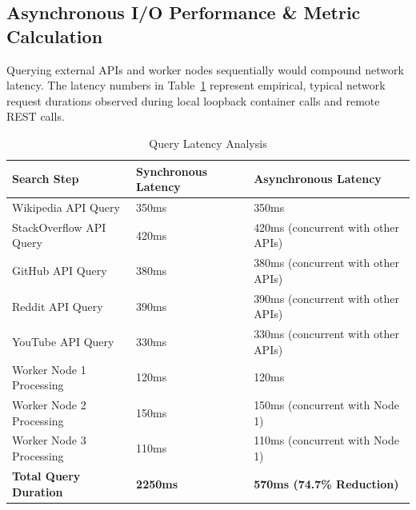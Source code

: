 \documentclass[11pt,a4paper]{article}
\begin{document}
\subsection{Asynchronous I/O Performance \& Metric Calculation}
Querying external APIs and worker nodes sequentially would compound network latency. The latency numbers in Table~\ref{tbl:latency_analysis} represent empirical, typical network request durations observed during local loopback container calls and remote REST calls.

\begin{table}[h!]
\centering
\begin{tabular}{@{}lll@{}}
\toprule
\textbf{Search Step} & \textbf{Synchronous Latency} & \textbf{Asynchronous Latency} \\ \midrule
Wikipedia API Query & 350ms & 350ms \\
StackOverflow API Query & 420ms & 420ms (concurrent with other APIs) \\
GitHub API Query & 380ms & 380ms (concurrent with other APIs) \\
Reddit API Query & 390ms & 390ms (concurrent with other APIs) \\
YouTube API Query & 330ms & 330ms (concurrent with other APIs) \\
Worker Node 1 Processing & 120ms & 120ms \\
Worker Node 2 Processing & 150ms & 150ms (concurrent with Node 1) \\
Worker Node 3 Processing & 110ms & 110ms (concurrent with Node 1) \\ \midrule
\textbf{Total Query Duration} & \textbf{2250ms} & \textbf{570ms (74.7\% Reduction)} \\ \bottomrule
\end{tabular}
\caption{Query Latency Analysis}
\label{tbl:latency_analysis}
\end{table}
\end{document}
